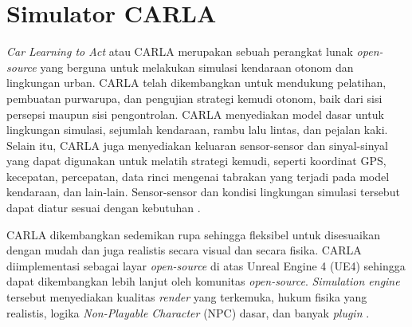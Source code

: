 

\section{Simulator CARLA}

\textit{Car Learning to Act} atau CARLA merupakan sebuah perangkat lunak
\textit{open-source} yang berguna untuk melakukan simulasi kendaraan otonom dan
lingkungan urban. CARLA telah dikembangkan untuk mendukung pelatihan, pembuatan
purwarupa, dan pengujian strategi kemudi otonom, baik dari sisi persepsi maupun
sisi pengontrolan. CARLA menyediakan model dasar untuk lingkungan simulasi,
sejumlah kendaraan, rambu lalu lintas, dan pejalan kaki. Selain itu, CARLA juga
menyediakan keluaran sensor-sensor dan sinyal-sinyal yang dapat digunakan untuk
melatih strategi kemudi, seperti koordinat GPS, kecepatan, percepatan, data rinci
mengenai tabrakan yang terjadi pada model kendaraan, dan lain-lain.
Sensor-sensor dan kondisi lingkungan simulasi tersebut dapat diatur sesuai
dengan kebutuhan \parencite{carla-dosovitskiy}.

CARLA dikembangkan sedemikan rupa sehingga fleksibel untuk disesuaikan dengan
mudah dan juga realistis secara visual dan secara fisika. CARLA diimplementasi
sebagai layar \textit{open-source} di atas Unreal Engine 4 (UE4) sehingga dapat
dikembangkan lebih lanjut oleh komunitas \textit{open-source}.
\textit{Simulation engine} tersebut menyediakan kualitas \textit{render} yang
terkemuka, hukum fisika yang realistis, logika \textit{Non-Playable Character}
(NPC) dasar, dan banyak \textit{plugin} \parencite{carla-dosovitskiy}.

